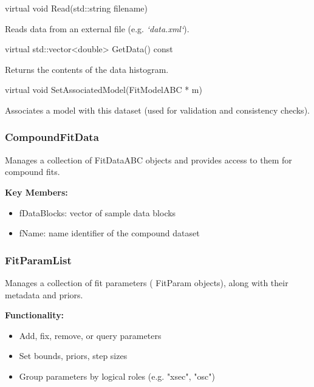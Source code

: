 \begin{description}[align=left]

  \item[] {\color{cadmiumred} virtual void Read(std::string filename)}

  Reads data from an external file (e.g. {\it`data.xml`}).

  \item[] {\color{cadmiumred} virtual std::vector<double> GetData() const}

  Returns the contents of the data histogram.

  \item[] {\color{cadmiumred} virtual void SetAssociatedModel(FitModelABC * m)}

  Associates a model with this dataset (used for validation and consistency checks).

\end{description}

\vspace{1em}
\subsubsection*{\color{cadmiumgreen}\bf CompoundFitData}

Manages a collection of {\color{cadmiumgreen} FitDataABC} objects and provides access to them for compound fits.

\vspace{0.5em}
\noindent\textbf{Key Members:}

\begin{itemize}
  \item {\color{amber}fDataBlocks}: vector of sample data blocks
  \item {\color{amber}fName}: name identifier of the compound dataset
\end{itemize}

\vspace{1em}
\subsubsection*{\color{cadmiumgreen}\bf FitParamList}

Manages a collection of fit parameters ({\color{cadmiumgreen} FitParam} objects), along with their metadata and priors.

\vspace{0.5em}
\noindent\textbf{Functionality:}

\begin{itemize}
  \item Add, fix, remove, or query parameters
  \item Set bounds, priors, step sizes
  \item Group parameters by logical roles (e.g. {\color{amber}"xsec"}, {\color{amber}"osc"})
\end{itemize}

